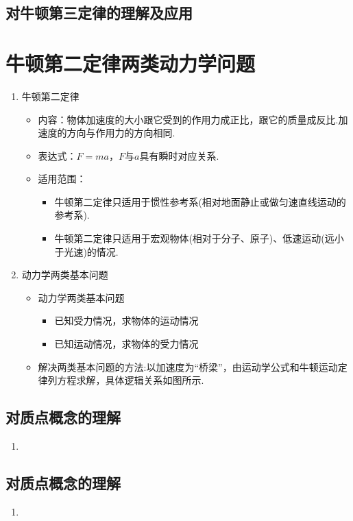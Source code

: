 \documentclass[cn,11pt]{elegantbook}
\begin{document}
\section{对牛顿第三定律的理解及应用}



\chapter{牛顿第二定律两类动力学问题}
\begin{enumerate}
   \item 牛顿第二定律
   \begin{itemize}
      \item 内容：物体加速度的大小跟它受到的作用力成正比，跟它的质量成反比.加速度的方向与作用力的方向相同.
      \item 表达式：$F=m a$，$F$与$a$具有瞬时对应关系.
      \item 适用范围：
      \begin{itemize}
         \item 牛顿第二定律只适用于惯性参考系(相对地面静止或做匀速直线运动的参考系).
         \item 牛顿第二定律只适用于宏观物体(相对于分子、原子)、低速运动(远小于光速)的情况.
      \end{itemize}
   \end{itemize}
   \item 动力学两类基本问题
   \begin{itemize}
      \item 动力学两类基本问题
      \begin{itemize}
         \item 已知受力情况，求物体的运动情况
         \item 已知运动情况，求物体的受力情况
      \end{itemize}
      \item 解决两类基本问题的方法:以加速度为“桥梁”，由运动学公式和牛顿运动定律列方程求解，具体逻辑关系如图所示.
   \end{itemize}
\end{enumerate}

\section{对质点概念的理解}
\begin{enumerate}
   \item 
\end{enumerate}

\section{对质点概念的理解}
\begin{enumerate}
   \item 
\end{enumerate}
\end{document}
